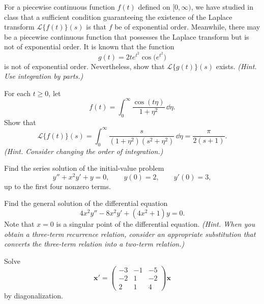 \documentclass[11pt,oneside]{article}
\begin{document}
\begin{problem}
For a piecewise continuous function $f(t)$ defined on $[0,\infty)$, we have studied in class that a sufficient condition guaranteeing the existence of the Laplace transform $\mathcal{L}\{f(t)\}(s)$ is that $f$ be of exponential order. Meanwhile, there may be a piecewise continuous function that possesses the Laplace transform but is not of exponential order. It is known that the function
\[
g(t)=2te^{t^2}\cos\bigl(e^{t^2}\bigr)
\]
is not of exponential order. Nevertheless, show that $\mathcal{L}\{g(t)\}(s)$ exists. \textit{(Hint. Use integration by parts.)}
\end{problem}

\begin{problem}
For each $t\ge0$, let
\[
f(t)=\int_0^\infty \frac{\cos(t\eta)}{1+\eta^2}\,\dd\eta.
\]
Show that
\[
\mathcal{L}\{f(t)\}(s)
=\int_0^\infty \frac{s}{(1+\eta^2)(s^2+\eta^2)}\,\dd\eta
=\frac{\pi}{2(s+1)}.
\]
\textit{(Hint. Consider changing the order of integration.)}
\end{problem}

\begin{problem}
Find the series solution of the initial-value problem
\[
y''+x^2y'+y=0,
\qquad
y(0)=2,
\qquad
y'(0)=3,
\]
up to the first four nonzero terms.
\end{problem}

\begin{problem}
Find the general solution of the differential equation
\[
4x^2y''-8x^2y'+(4x^2+1)y=0.
\]
Note that $x=0$ is a singular point of the differential equation. \textit{(Hint. When you obtain a three-term recurrence relation, consider an appropriate substitution that converts the three-term relation into a two-term relation.)}
\end{problem}

\begin{problem}
Solve
\[
\mathbf x'=
\begin{pmatrix}
-3&-1&-5\\
-2&1&-2\\
2&1&4
\end{pmatrix}\mathbf x
\]
by diagonalization.
\end{problem}
\end{document}
